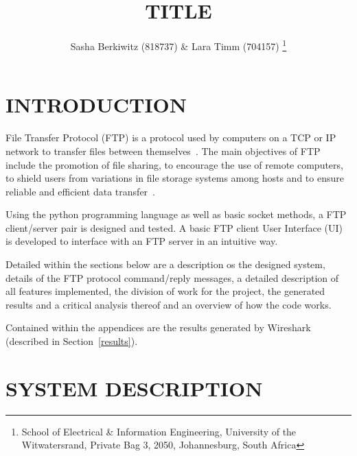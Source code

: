 \documentclass[10pt,twocolumn]{witseiepaper}
\begin{document}
\title{TITLE}

\author{Sasha Berkiwitz (818737) \& Lara Timm (704157)
\thanks{School of Electrical \& Information Engineering, University of the
Witwatersrand, Private Bag 3, 2050, Johannesburg, South Africa}
}


%
\abstract{}

\keywords{}

\maketitle
\pagestyle{plain}
\setcounter{page}{1}


\section{INTRODUCTION}

File Transfer Protocol (FTP) is a protocol used by computers on a TCP or IP network to transfer files between themselves~\cite{FTPbeginners}. The main objectives of FTP include the promotion of file sharing, to encourage the use of remote computers, to shield users from variations in file storage systems among hosts and to ensure reliable and efficient data transfer~\cite{rfc959}. 

Using the python programming language as well as basic socket methods, a FTP client/server pair is designed and tested. A basic FTP client User Interface (UI) is developed to interface with an FTP server in an intuitive way.

Detailed within the sections below are a description os the designed system, details of the FTP protocol command/reply messages, a detailed description of all features implemented, the division of work for the project, the generated results and a critical analysis thereof and an overview of how the code works. 

Contained within the appendices are the results generated by Wireshark (described in Section~\ref{results}).

\section{SYSTEM DESCRIPTION} %
\end{document}
